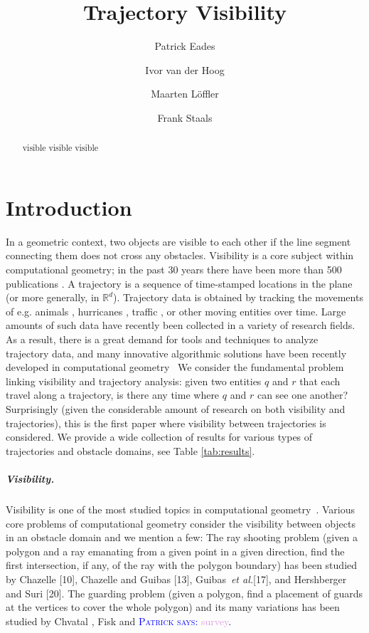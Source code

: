 \documentclass[a4paper, UKenglish]{lipics-v2018}
\title{Trajectory Visibility}
\author{Patrick Eades}{University of Sydney}{patrick.eades@sydney.edu.au}{}{}
\author{Ivor van der Hoog}{Utrecht University}{i.d.vanderhoog@uu.nl}{}{}
\author{Maarten Löffler}{Utrecht University}{m.loffler@uu.nl}{}{}
\author{Frank Staals}{Utrecht University}{f.staals@uu.nl}{}{}
\newcommand{\myremark}[4]{\textcolor{blue}{\textsc{#1 #2:}} \textcolor{#4}{\textsf{#3}}}
\newcommand{\patrick}[2][says]{\myremark{Patrick}{#1}{#2}{Plum}}
\newcommand{\etal}{\textit{et al.}\xspace}
\begin{document}
\maketitle

\begin{abstract}
    visible visible visible
\end{abstract}


\newpage
\section{Introduction}

In a geometric context, two objects are visible to each other if the line segment connecting them does not cross any obstacles. Visibility is a core subject within computational geometry; in the past 30 years there have been more than 500 publications \cite{ORourke87}. A trajectory is a sequence of time-stamped locations in the plane (or more generally, in $\mathbb{R}^d$). Trajectory data is obtained by tracking the movements of e.g. animals \cite{BovetB88,Calenge200934,gal-nmibc-09}, hurricanes \cite{Stohl1998947}, traffic \cite{lltx-dftf-10}, or other moving entities \cite{dwf-rpm-09} over time.
Large amounts of such data have recently been collected in a variety of research fields. As a result, there is a great demand for tools and
techniques to analyze trajectory data, and many innovative algorithmic solutions have been recently developed in computational geometry~\cite{bbgll-dcpcs-11,grsc-pcecu-07,gs-tcmrm-99,lhw-tc-07,vgk-dsmt-02}
We consider the fundamental problem linking visibility and trajectory analysis: given two entities $q$ and $r$ that each travel along a trajectory, is there any time where $q$ and $r$ can see one another? Surprisingly (given the considerable amount of research on both visibility and trajectories), this is the first paper where visibility between trajectories is considered. We provide a wide collection of results for various types of trajectories and obstacle domains, see Table \ref{tab:results}.


\subparagraph{Visibility.}

Visibility is one of the most studied topics in computational geometry~\cite {moet,welzl1985constructing,POCCHIOLA1996279}. Various core problems of computational geometry consider the visibility between objects in an obstacle domain and we mention a few:
The ray shooting problem (given a polygon and a ray emanating from a given point in a given direction, find the first intersection, if any, of the ray with the polygon boundary) has been studied by Chazelle [10], Chazelle and Guibas [13], Guibas~\etal [17], and Hershberger and Suri [20]. The guarding problem (given a polygon, find a placement of guards at the vertices to cover the whole polygon) and its many variations has been studied by Chvatal \cite{Chvatal75}, Fisk \cite{Fisk78} and \patrick{survey}.
\end{document}

